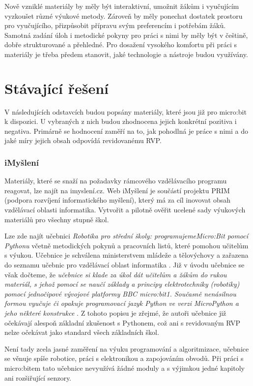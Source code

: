 \documentclass[
  digital,     %
  oneside,     %
  nosansbold,  %
  colorbold, %
  lof,         %
  nolot,         %
]{fithesis4}
\begin{document}
Nově vzniklé materiály by měly být interaktivní, umožnit žákům i vyučujícím vyzkoušet různé výukové metody. Zároveň by měly ponechat dostatek prostoru pro vyučujícího, přizpůsobit přípravu svým preferencím i potřebám žáků. Samotná zadání úloh i metodické pokyny pro práci s nimi by měly být v češtině, dobře strukturované a přehledné. Pro dosažení vysokého komfortu při práci s materiály je třeba předem stanovit, jaké technologie a nástroje budou využívány.

\section{Stávající řešení}
V následujících odstavcích budou popsány materiály, které jsou již pro micro:bit k dispozici. U vybraných z nich budou zhodnocena jejich konkrétní pozitiva i negativa. Primárně se hodnocení zaměří na to, jak pohodlná je práce s nimi a do jaké míry jejich obsah odpovídá revidovanému RVP. 

\subsubsection{iMyšlení}
Materiály, které se snaží na požadavky rámcového vzdělávacího programu reagovat, lze najít na imyslení.cz. Web iMyšlení je součástí projektu PRIM (podpora rozvíjení informatického myšlení), který má za cíl inovovat obsah vzdělávací oblasti informatika. Vytvořit a pilotně ověřit ucelené sady výukových materiálů pro všechny stupně škol. 

Lze zde najít učebnici \textit{Robotika pro střední školy: programujeme\break Micro:Bit pomocí Pythonu} včetně metodických pokynů a pracovních listů, které pomohou učitelům s výukou. Učebnice je schválena ministerstvem mládeže a tělovýchovy a zařazena do seznamu učebnic pro vzdělávací oblast informatika \cite{Summerfield10}. Již v úvodu učebnice se však dočteme, že \textit{učebnice si klade za úkol dát učitelům a žákům do rukou materiál, s jehož pomocí se naučí základy a principy elektrotechniky (robotiky) pomocí jednočipové vývojové platformy BBC micro:bit1. Současně nenásilnou formou vyučuje či opakuje programovací jazyk Python ve verzi MicroPython a jeho některé konstrukce} \cite{pythonImysleni}. Z tohoto popisu je zřejmé, že autoři učebnice již očekávají alespoň základní zkušenost s Pythonem, což ani s revidovaným RVP nelze očekávat jako standard všech základních škol. 

Není tady zcela jasné zaměření na výuku programování a algoritmizace, učebnice se věnuje spíše robotice, práci s elektronikou a zapojováním obvodů. Při práci s micro:bitem tato učebnice nevyužívá žádné moduly a s výjimkou jedné kapitoly ani rozšiřující senzory. 
\end{document}
